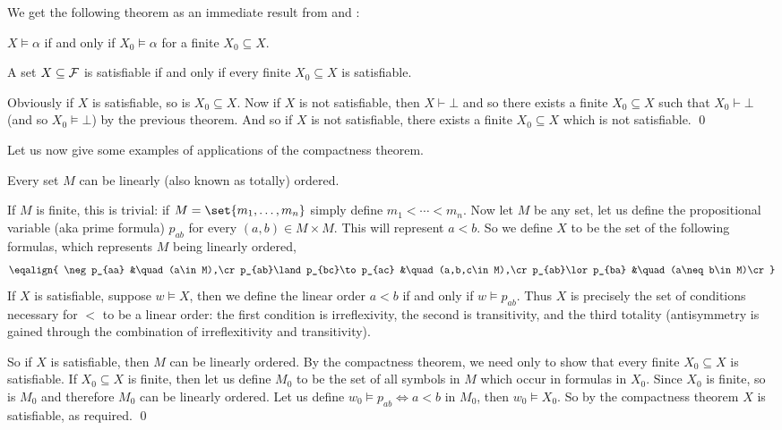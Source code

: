 We get the following theorem as an immediate result from  and :

\bthrm

    $X\vDash\alpha$ if and only if $X_0\vDash\alpha$ for a finite $X_0\subseteq X$.

\ethrm

\bthrm[title=The Compactness Theorem, name=propcompactthrm]

    A set $X\subseteq{\cal F}$ is satisfiable if and only if every finite $X_0\subseteq X$ is satisfiable.

\ethrm

Obviously if $X$ is satisfiable, so is $X_0\subseteq X$.
Now if $X$ is not satisfiable, then $X\vdash\bot$ and so there exists a finite $X_0\subseteq X$ such that $X_0\vdash\bot$ (and so $X_0\vDash\bot$) by the previous theorem.
And so if $X$ is not satisfiable, there exists a finite $X_0\subseteq X$ which is not satisfiable.
\qed

Let us now give some examples of applications of the compactness theorem.

\bprop

    Every set $M$ can be linearly (also known as totally) ordered.

\eprop

If $M$ is finite, this is trivial: if $M=\set{m_1,\dots,m_n}$ simply define $m_1<\cdots<m_n$.
Now let $M$ be any set, let us define the propositional variable (aka prime formula) $p_{ab}$ for every $(a,b)\in M\times M$.
This will represent $a<b$.
So we define $X$ to be the set of the following formulas, which represents $M$ being linearly ordered,
$$ \eqalign{
    \neg p_{aa} &\quad (a\in M),\cr
    p_{ab}\land p_{bc}\to p_{ac} &\quad (a,b,c\in M),\cr
    p_{ab}\lor p_{ba} &\quad (a\neq b\in M)\cr
} $$
If $X$ is satisfiable, suppose $w\vDash X$, then we define the linear order $a<b$ if and only if $w\vDash p_{ab}$.
Thus $X$ is precisely the set of conditions necessary for $<$ to be a linear order: the first condition is irreflexivity, the second is transitivity, and the third totality (antisymmetry is gained through
the combination of irreflexitivity and transitivity).

So if $X$ is satisfiable, then $M$ can be linearly ordered.
By the compactness theorem, we need only to show that every finite $X_0\subseteq X$ is satisfiable.
If $X_0\subseteq X$ is finite, then let us define $M_0$ to be the set of all symbols in $M$ which occur in formulas in $X_0$.
Since $X_0$ is finite, so is $M_0$ and therefore $M_0$ can be linearly ordered.
Let us define $w_0\vDash p_{ab}\iff a<b$ in $M_0$, then $w_0\vDash X_0$.
So by the compactness theorem $X$ is satisfiable, as required.
\qed

